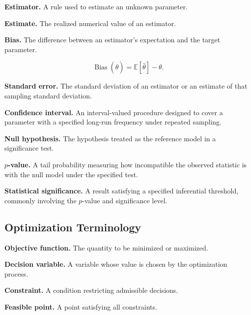 \textbf{Estimator.}
A rule used to estimate an unknown parameter.

\medskip

\textbf{Estimate.}
The realized numerical value of an estimator.

\medskip

\textbf{Bias.}
The difference between an estimator's expectation and the target parameter.

\[
\boxed{
\operatorname{Bias}(\hat\theta)
=
\mathbb{E}[\hat\theta]-\theta.
}
\]

\medskip

\textbf{Standard error.}
The standard deviation of an estimator or an estimate of that sampling
standard deviation.

\medskip

\textbf{Confidence interval.}
An interval-valued procedure designed to cover a parameter with a specified
long-run frequency under repeated sampling.

\medskip

\textbf{Null hypothesis.}
The hypothesis treated as the reference model in a significance test.

\medskip

\textbf{\(p\)-value.}
A tail probability measuring how incompatible the observed statistic is with
the null model under the specified test.

\medskip

\textbf{Statistical significance.}
A result satisfying a specified inferential threshold, commonly involving
the \(p\)-value and significance level.

\subsection{Optimization Terminology}
\label{subsec:optimization-terminology-reference}

\textbf{Objective function.}
The quantity to be minimized or maximized.

\medskip

\textbf{Decision variable.}
A variable whose value is chosen by the optimization process.

\medskip

\textbf{Constraint.}
A condition restricting admissible decisions.

\medskip

\textbf{Feasible point.}
A point satisfying all constraints.

